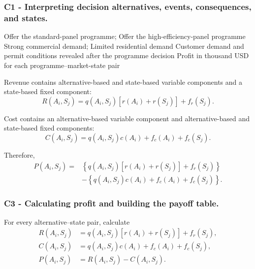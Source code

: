 \subsubsection*{C1 - Interpreting decision alternatives, events, consequences, and states.}
\label{subsec:problem16-solar-installation-programme-c1}

\DecisionElementsTable
{Offer the standard-panel programme; Offer the high-efficiency-panel programme}
{Strong commercial demand; Limited residential demand}
{Customer demand and permit conditions revealed after the programme decision}
{Profit in thousand USD for each programme--market-state pair}

Revenue contains alternative-based and state-based variable components and
a state-based fixed component:
\[
R(A_i,S_j)
=
q(A_i,S_j)
\left[
r(A_i)+r(S_j)
\right]
+
f_r(S_j).
\]

Cost contains an alternative-based variable component and alternative-based
and state-based fixed components:
\[
C(A_i,S_j)
=
q(A_i,S_j)c(A_i)
+
f_c(A_i)
+
f_c(S_j).
\]

Therefore,
\[
\begin{aligned}
	P(A_i,S_j)
	={}&
	\left\{
	q(A_i,S_j)
	\left[
	r(A_i)+r(S_j)
	\right]
	+
	f_r(S_j)
	\right\}
	\\
	&-
	\left\{
	q(A_i,S_j)c(A_i)
	+
	f_c(A_i)
	+
	f_c(S_j)
	\right\}.
\end{aligned}
\]


\subsubsection*{C3 - Calculating profit and building the payoff table.}
\label{subsec:problem16-solar-installation-programme-c3}

For every alternative--state pair, calculate
\[
\begin{aligned}
	R(A_i,S_j)
	&=
	q(A_i,S_j)
	\left[
	r(A_i)+r(S_j)
	\right]
	+
	f_r(S_j),
	\\
	C(A_i,S_j)
	&=
	q(A_i,S_j)c(A_i)
	+
	f_c(A_i)
	+
	f_c(S_j),
	\\
	P(A_i,S_j)
	&=
	R(A_i,S_j)-C(A_i,S_j).
\end{aligned}
\]

